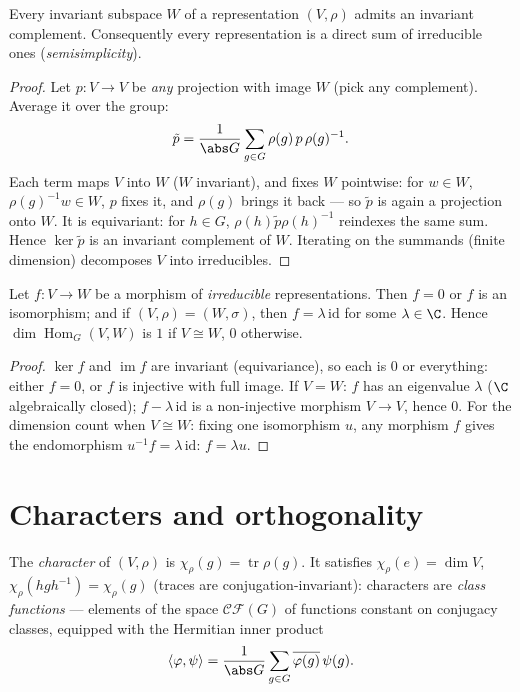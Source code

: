 \begin{theorem}[Maschke]\label{thm:b3:representations:maschke}
Every invariant subspace $W$ of a representation $(V, \rho)$
admits an invariant complement. Consequently every representation
is a direct sum of irreducible ones
(\emph{semisimplicity}).
\end{theorem}

\begin{proof}
Let $p \colon V \to V$ be \emph{any} projection with image $W$
(pick any complement). Average it over the group:
\[
\tilde p = \frac1{\abs G}\sum_{g \in G} \rho(g)\,p\,\rho(g)^{-1}.
\]
Each term maps $V$ into $W$ ($W$ invariant), and fixes $W$
pointwise: for $w \in W$, $\rho(g)^{-1}w \in W$, $p$ fixes it,
and $\rho(g)$ brings it back --- so $\tilde p$ is again a
projection onto $W$. It is equivariant: for $h \in G$,
$\rho(h)\tilde p\rho(h)^{-1}$ reindexes the same sum. Hence $\ker
\tilde p$ is an invariant complement of $W$. Iterating on the
summands (finite dimension) decomposes $V$ into irreducibles.
\end{proof}

\begin{theorem}\label{thm:b3:representations:schur}
Let $f \colon V \to W$ be a morphism of \emph{irreducible}
representations. Then $f = 0$ or $f$ is an isomorphism; and if
$(V,\rho) = (W,\sigma)$, then $f = \lambda\,\mathrm{id}$ for some
$\lambda \in \C$. Hence
$\dim\operatorname{Hom}_G(V, W)$ is $1$ if $V \cong W$, $0$
otherwise.
\end{theorem}

\begin{proof}
$\ker f$ and $\operatorname{im} f$ are invariant (equivariance),
so each is $0$ or everything: either $f = 0$, or $f$ is injective
with full image. If $V = W$: $f$ has an eigenvalue $\lambda$ ($\C$
algebraically closed); $f - \lambda\,\mathrm{id}$ is a
non-injective morphism $V \to V$, hence $0$. For the dimension
count when $V \cong W$: fixing one isomorphism $u$, any morphism
$f$ gives the endomorphism $u^{-1}f = \lambda\,\mathrm{id}$: $f =
\lambda u$.
\end{proof}

\section{Characters and orthogonality}

\begin{definition}\label{def:b3:representations:character}
The \emph{character} of $(V, \rho)$ is
$\chi_\rho(g) = \operatorname{tr}\rho(g)$. It satisfies
$\chi_\rho(e) = \dim V$, $\chi_\rho(hgh^{-1}) = \chi_\rho(g)$
(traces are conjugation-invariant): characters are \emph{class
functions} --- elements of the space
$\mathcal{CF}(G)$ of functions constant on conjugacy classes,
equipped with the Hermitian inner product
\[
\langle \varphi, \psi\rangle = \frac1{\abs G}\sum_{g \in G}
\overline{\varphi(g)}\,\psi(g).
\]
\end{definition}

